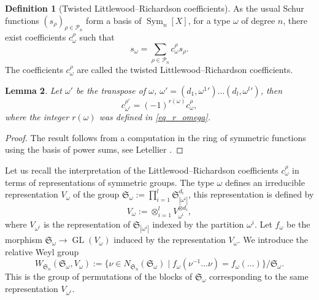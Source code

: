 \documentclass[JEP,XML,SOM,NoEqCountersInSection,Unicode,published]{cedram}
\theoremstyle{definition}
\newtheorem{definition}{Definition}[section]
\theoremstyle{plain}
\newtheorem{lemma}[definition]{Lemma}
\DeclareMathOperator{\SymF}{Sym}
\DeclareMathOperator{\GL}{GL}
\newcommand{\Sym}{\mathfrak{S}}
\newcommand{\Part}{\mathcal{P}}
\newcommand{\inv}{^{-1}}
\begin{document}
\begin{definition}[Twisted Littlewood--Richardson coefficients]\label{def_twisted_c}
As the usual Schur functions $(s_{\rho})_{\rho\in \Part_n}$ form a basis of $\SymF_n [X]$, for a type $\omega$ of degree $n$, there exist coefficients $c_{\omega}^{\rho}$ such that
\[
s_{\omega} = \sum_{\rho\in\Part_n} c^{\rho}_{\omega} s_{\rho}.
\]
The coefficients $c_{\omega}^{\rho}$ are called the twisted Littlewood--Richardson coefficients.
\end{definition}
\begin{lemma}\label{lemma_transpose_r_omega}
Let $\omega'$ be the transpose of $\omega$, \ie $\omega'=(d_1,{\omega^1}')\dots(d_l,{\omega^l}')$, then
\[
c^{\rho'}_{\omega'}=(-1)^{r(\omega)} c^{\rho}_{\omega},
\]
where the integer $r(\omega)$ was defined in \eqref{eq_r_omega}.
\end{lemma}
\begin{proof}
The result follows from a computation in the ring of symmetric functions using the basis of power sums, see Letellier \cite[6.2.4]{Letellier_gl}.
\end{proof}

Let us recall the interpretation of the Littlewood--Richardson coefficients $c_{\omega}^{\rho}$ in terms of representations of symmetric groups. The type $\omega$ defines an irreducible representation $V_{\omega}$ of the group $\Sym_{\omega}:=\prod_{i=1}^l \Sym_{|\omega^i|}^{d_i}$, this representation is defined by
\[
V_{\omega}:=\otimes_{i=1}^l V_{\omega^i}^{\otimes d_i},
\]
where $V_{\omega^i}$ is the representation of $\Sym_{|\omega^i|}$ indexed by the partition $\omega^i$. Let $f_{\omega}$ be the morphism $\Sym_{\omega}\to \GL(V_{\omega})$ induced by the representation $V_{\omega}$. We introduce the relative Weyl group
\[
W_{\Sym_n}(\Sym_{\omega},V_{\omega}) :=\lbrace \nu \in N_{\Sym_n}(\Sym_{\omega}) \mid f_{\omega}(\nu\inv \dots \nu) = f_{\omega}(\dots)\rbrace/ \Sym_{\omega}.
\]
This is the group of permutations of the blocks of $\Sym_{\omega}$ corresponding to the same representation $V_{\omega^i}$.
\end{document}
